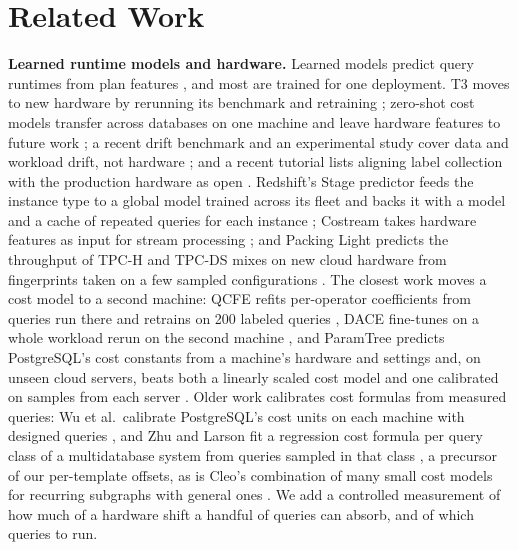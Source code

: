\documentclass[sigconf,review]{acmart}
\begin{document}
\section{Related Work}
\label{sec:related}
\textbf{Learned runtime models and hardware.} Learned models predict query
runtimes from plan features
\cite{ganapathi2009,akdere2012,marcus2019,sun2020,zhao2022}, and most are
trained for one deployment. T3 moves to new hardware by rerunning its
benchmark and retraining \cite{rieger2025t3}; zero-shot cost models
transfer across databases on one machine and leave hardware features to
future work \cite{hilprecht2022}; a recent drift benchmark and an
experimental study cover data and workload drift, not hardware
\cite{zhao2026neurbench,meng2026drift}; and a recent tutorial lists
aligning label collection with the production hardware as open
\cite{heinrich2025tutorial}. Redshift's Stage predictor feeds the instance
type to a global model trained across its fleet and backs it with a model
and a cache of repeated queries for each instance \cite{wu2024stage};
Costream takes hardware features as input for stream processing
\cite{heinrich2024costream}; and Packing Light predicts the throughput of
TPC-H and TPC-DS mixes on new cloud hardware from fingerprints taken on a
few sampled configurations \cite{duggan2013}. The closest work moves a cost
model to a second machine: QCFE refits per-operator coefficients from
queries run there and retrains on 200 labeled queries \cite{yan2024qcfe},
DACE fine-tunes on a whole workload rerun on the second machine
\cite{liang2024dace}, and ParamTree predicts PostgreSQL's cost constants
from a machine's hardware and settings and, on unseen cloud servers, beats
both a linearly scaled cost model and one calibrated on samples from each
server \cite{yang2023}. Older work calibrates cost formulas from measured
queries: Wu et al.\ calibrate PostgreSQL's cost units on each machine with
designed queries \cite{wu2013}, and Zhu and Larson fit a regression cost
formula per query class of a multidatabase system from queries sampled in
that class \cite{zhu1994}, a precursor of our per-template offsets, as is
Cleo's combination of many small cost models for recurring subgraphs with
general ones \cite{siddiqui2020cleo}. We add a controlled measurement of
how much of a hardware shift a handful of queries can absorb, and of which
queries to run.
\end{document}
